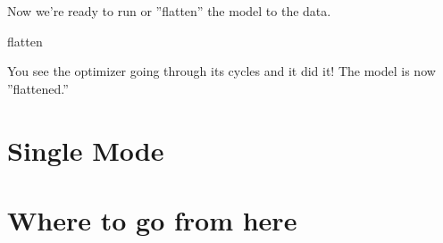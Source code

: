 \documentclass{book}
\begin{document}
Now we're ready to run or ''flatten'' the model to the data.
\begin{example}
  flatten
\end{example}
You see the optimizer going through its cycles and it did it! The model is now
''flattened.''

\chapter{Single Mode}
\label{c:single_mode}

\chapter{Where to go from here}
\label{c:where_to_go}
\end{document}
